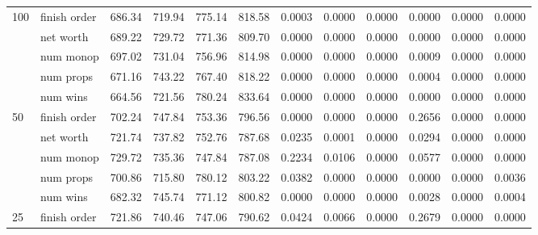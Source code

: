 \begin{landscape}
\begin{table}[ht]
\begin{tabularx}{\linewidth}{|p{1in}|p{1in}|r|r|r|r|r|r|r|r|r|r|}
      \multirow{5}{*}{100} & finish order & 686.34 & 719.94 & \cellcolor{green!55!white}775.14 & \cellcolor{green!55!white}818.58 & 0.0003 & 0.0000 & 0.0000 & 0.0000 & 0.0000 & 0.0000 \\
\cline{2-12}             & net worth & 689.22 & 729.72 & \cellcolor{green!55!white}771.36 & \cellcolor{green!55!white}809.70 & 0.0000 & 0.0000 & 0.0000 & 0.0000 & 0.0000 & 0.0000 \\
\cline{2-12}             & num monop & 697.02 & 731.04 & \cellcolor{green!55!white}756.96 & \cellcolor{green!55!white}814.98 & 0.0000 & 0.0000 & 0.0000 & 0.0009 & 0.0000 & 0.0000 \\
\cline{2-12}             & num props & 671.16 & 743.22 & \cellcolor{green!55!white}767.40 & \cellcolor{green!55!white}818.22 & 0.0000 & 0.0000 & 0.0000 & 0.0004 & 0.0000 & 0.0000 \\
\cline{2-12}             & num wins & 664.56 & 721.56 & \cellcolor{green!55!white}780.24 & \cellcolor{green!55!white}833.64 & 0.0000 & 0.0000 & 0.0000 & 0.0000 & 0.0000 & 0.0000 \\
\cline{1-12}
      \multirow{5}{*}{50} & finish order & 702.24 & 747.84 & \cellcolor{green!55!white}753.36 & \cellcolor{green!55!white}796.56 & 0.0000 & 0.0000 & 0.0000 & \cellcolor{red!55!white}0.2656 & 0.0000 & 0.0000 \\
\cline{2-12}             & net worth & 721.74 & 737.82 & \cellcolor{green!55!white}752.76 & \cellcolor{green!55!white}787.68 & \cellcolor{red!55!white}0.0235 & 0.0001 & 0.0000 & \cellcolor{red!55!white}0.0294 & 0.0000 & 0.0000 \\
\cline{2-12}             & num monop & 729.72 & 735.36 & 747.84 & \cellcolor{green!55!white}787.08 & \cellcolor{red!55!white}0.2234 & \cellcolor{red!55!white}0.0106 & 0.0000 & \cellcolor{red!55!white}0.0577 & 0.0000 & 0.0000 \\
\cline{2-12}             & num props & 700.86 & 715.80 & \cellcolor{green!55!white}780.12 & \cellcolor{green!55!white}803.22 & \cellcolor{red!55!white}0.0382 & 0.0000 & 0.0000 & 0.0000 & 0.0000 & 0.0036 \\
\cline{2-12}             & num wins & 682.32 & 745.74 & \cellcolor{green!55!white}771.12 & \cellcolor{green!55!white}800.82 & 0.0000 & 0.0000 & 0.0000 & 0.0028 & 0.0000 & 0.0004 \\
\cline{1-12}
      \multirow{5}{*}{25} & finish order & 721.86 & 740.46 & 747.06 & \cellcolor{green!55!white}790.62 & \cellcolor{red!55!white}0.0424 & 0.0066 & 0.0000 & \cellcolor{red!55!white}0.2679 & 0.0000 & 0.0000 \\

\end{tabularx}
\end{table}
\end{landscape}

